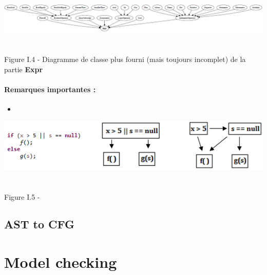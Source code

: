 \documentclass{report}
\begin{document}
\begin{center}
\includegraphics[scale=0.5]{data/expr2.png}
~\\~\\Figure I.4 - Diagramme de classe plus fourni (mais toujours incomplet) de la partie \textbf{Expr}
\end{center}

\subsubsection{Remarques importantes :}

\vspace{4mm}
\begin{itemize}
\item \vspace{1mm}
\end{itemize}

\begin{center}
\includegraphics[scale=0.85]{data/fail-fast.png}
~\\~\\Figure I.5 - 
\end{center}

\paragraph{}
\hspace{4mm}\textnormal{}

\section{AST to CFG}

\paragraph{}
\hspace{4mm}\textnormal{}

\chapter{Model checking}
\end{document}
